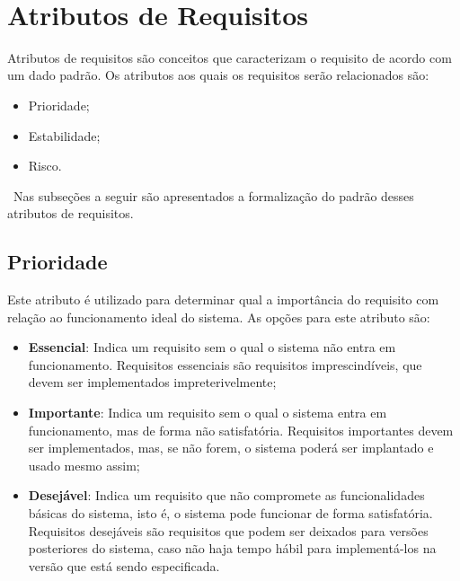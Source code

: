 	\ \newline
	\section[Atributos de Requisitos]{Atributos de Requisitos}
	\label{sec:tgr_atributos}
		Atributos de requisitos são conceitos que caracterizam o requisito de acordo com um dado padrão. Os atributos aos quais os requisitos serão relacionados são:
		\begin{itemize}
			\item{Prioridade;}
			\item{Estabilidade;}
			\item{Risco.}
		\end{itemize}
		\ \indent Nas subseções a seguir são apresentados a formalização do padrão desses atributos de requisitos.

		\subsection[Prioridade]{Prioridade}
		\label{subsec:tgr_atributos_prioridade}
			Este atributo é utilizado para determinar qual a importância do requisito com relação ao funcionamento ideal do sistema. As opções para este atributo são:
			\begin{itemize}
				\item{\textbf{Essencial}: Indica um requisito sem o qual o sistema não entra em funcionamento. Requisitos essenciais são requisitos imprescindíveis, que devem ser implementados impreterivelmente;}
				\item{\textbf{Importante}: Indica um requisito sem o qual o sistema entra em funcionamento, mas de forma não satisfatória. Requisitos importantes devem ser implementados, mas, se não forem, o sistema poderá ser implantado e usado mesmo assim;}
				\item{\textbf{Desejável}: Indica um requisito que não compromete as funcionalidades básicas do sistema, isto é, o sistema pode funcionar de forma satisfatória. Requisitos desejáveis são requisitos que podem ser deixados para versões posteriores do sistema, caso não haja tempo hábil para implementá-los na versão que está sendo especificada.}
			\end{itemize}

